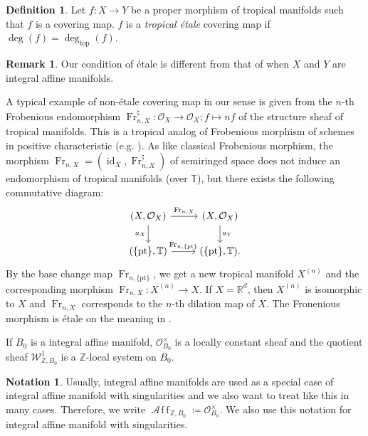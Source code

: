 \documentclass[a4paper,dvipdfmx,reqno,12pt]{amsart}
\theoremstyle{definition}
\newtheorem{definition}[theorem]{Definition}
\newtheorem{Not}[theorem]{Notation}
\newtheorem{remark}[theorem]{Remark}
\newcommand{\deq}{\coloneqq}
\newcommand{\Z}{\mathbb{Z}}%
\newcommand{\mcal}[1]{\mathcal{#1}}%
\newcommand{\opn}[1]{\operatorname{#1}}
\newcommand{\AffS}{{\mathop{\mcal{A}\!f\!\!f\!}\nolimits}}
\numberwithin{equation}{section}
\begin{document}
\begin{definition} \label{definition-etale-covering}
Let $f\colon X\to Y$ be a proper morphism 
of tropical manifolds such
that $f$ is a covering map.
$f$ is a \emph{tropical \'etale} covering map 
if $\opn{deg}(f)=\opn{deg}_{\mathrm{top}}(f)$.  
\end{definition}
\begin{remark}
Our condition of \'etale is different from that of 
\cite[Definition 1.1]{grossMirrorSymmetryLogarithmic2006a}
when $X$ and $Y$ are integral affine manifolds.
\end{remark}

A typical example of non-\'etale covering map 
in our sense is given
from the $n$-th Frobenious endomorphism 
$\opn{Fr}_{n,X}^{\natural}\colon \mathcal{O}_X \to \mathcal{O}_X; f\mapsto nf$ of 
the structure sheaf of tropical manifolds. 
This is a tropical analog of Frobenious morphism of 
schemes in positive characteristic 
(e.g. \cite[]{}). As like classical Frobenious morphism, 
the morphism $\opn{Fr}_{n,X}=(\opn{id}_X,\opn{Fr}_{n,X}^{\natural})$ of semiringed space does 
not induce an endomorphism of tropical manifolds 
(over $\mathbb{T}$), but
there exists the following commutative diagram:
\begin{equation}
\begin{tikzcd}
 (X,\mathcal{O}_X) \arrow[r,"{\opn{Fr}_{n,X}}"] 
\arrow[d,"{a_X}"']
 &   (X,\mathcal{O}_X) \arrow[d,"{a_Y}"] \\
(\{\opn{pt}\},\mathbb{T})
\arrow[r,"{\opn{Fr}_{n,\{\opn{pt}\}}}"]
 & (\{\opn{pt}\},\mathbb{T}).
\end{tikzcd}
\end{equation}
By the base change map $\opn{Fr}_{n,\{\mathrm{pt}\}}$, we get 
a new tropical manifold $X^{(n)}$
and the corresponding morphism 
$\opn{Fr}_{n,X}\colon X^{(n)}\to X$. 
If $X=\mathbb{R}^{d}$, then $X^{(n)}$ is 
isomorphic to $X$ and 
$\opn{Fr}_{n,X}$ corresponds to 
the $n$-th dilation map of $X$.
The Fronenious morphism is 
\'etale on the meaning in 
\cite{grossMirrorSymmetryLogarithmic2006a}.


If $B_0$ is a integral affine manifold, 
$\mcal{O}^{\times}_{B_0}$ is a locally constant sheaf and the quotient sheaf $\mcal{W}^{1}_{\Z,B_0}$ is a $\Z$-local system on $B_0$.

\begin{Not}
  Usually, integral affine manifolds are used as a special case of integral affine manifold with singularities and we also want to treat like this in many cases.
  Therefore, we write 
$\AffS_{\Z,B_0}\deq \mcal{O}^{\times}_{B_0}$. We also use this notation for integral affine manifold with singularities.
\end{Not}
\end{document}
